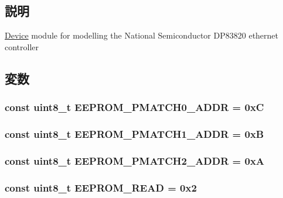 \subsection{説明}
\hyperlink{namespaceDevice}{Device} module for modelling the National Semiconductor DP83820 ethernet controller 

\subsection{変数}
\hypertarget{ns__gige_8hh_acac34df6d31e87d4ae3e715f42bd770d}{
\subsubsection[{EEPROM\_\-PMATCH0\_\-ADDR}]{\setlength{\rightskip}{0pt plus 5cm}const uint8\_\-t {\bf EEPROM\_\-PMATCH0\_\-ADDR} = 0xC}}
\label{ns__gige_8hh_acac34df6d31e87d4ae3e715f42bd770d}
\hypertarget{ns__gige_8hh_aa5de04551e0949c15f9b84774373f1d8}{
\subsubsection[{EEPROM\_\-PMATCH1\_\-ADDR}]{\setlength{\rightskip}{0pt plus 5cm}const uint8\_\-t {\bf EEPROM\_\-PMATCH1\_\-ADDR} = 0xB}}
\label{ns__gige_8hh_aa5de04551e0949c15f9b84774373f1d8}
\hypertarget{ns__gige_8hh_a04ace9703bc38e08ebc513308e810472}{
\subsubsection[{EEPROM\_\-PMATCH2\_\-ADDR}]{\setlength{\rightskip}{0pt plus 5cm}const uint8\_\-t {\bf EEPROM\_\-PMATCH2\_\-ADDR} = 0xA}}
\label{ns__gige_8hh_a04ace9703bc38e08ebc513308e810472}
\hypertarget{ns__gige_8hh_a93964da128d1f6ec065f0d049a6ee86a}{
\subsubsection[{EEPROM\_\-READ}]{\setlength{\rightskip}{0pt plus 5cm}const uint8\_\-t {\bf EEPROM\_\-READ} = 0x2}}
